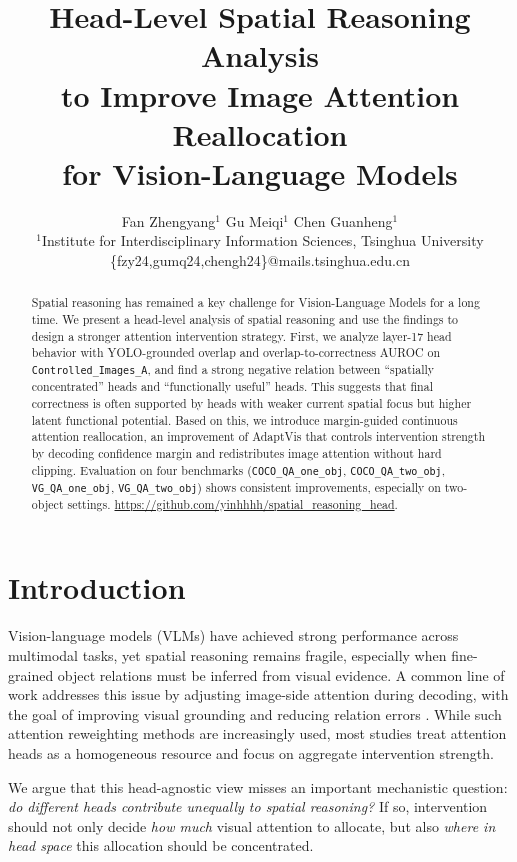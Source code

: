 \documentclass{article}
\title{Head-Level Spatial Reasoning Analysis \\
to Improve Image Attention Reallocation \\
for Vision-Language Models}
\author{
Fan Zhengyang$^{1}$ \quad Gu Meiqi$^{1}$ \quad Chen Guanheng$^{1}$ \\
$^{1}$Institute for Interdisciplinary Information Sciences, Tsinghua University \\
\{fzy24,gumq24,chengh24\}@mails.tsinghua.edu.cn
}
\date{}
\begin{document}
\maketitle

\begin{abstract}
Spatial reasoning has remained a key challenge for Vision-Language
Models for a long time. We present a head-level analysis of spatial
reasoning and use the findings to design a stronger attention
intervention strategy. First, we analyze layer-17 head behavior with
YOLO-grounded overlap and overlap-to-correctness AUROC on
\texttt{Controlled\_Images\_A}, and find a strong negative relation
between ``spatially concentrated'' heads and ``functionally useful''
heads. This suggests that final correctness is often supported by heads
with weaker current spatial focus but higher latent functional
potential. Based on this, we introduce margin-guided continuous
attention reallocation, an improvement of AdaptVis that controls
intervention strength by decoding confidence margin and redistributes
image attention without hard clipping. Evaluation on four benchmarks
(\texttt{COCO\_QA\_one\_obj}, \texttt{COCO\_QA\_two\_obj},
\texttt{VG\_QA\_one\_obj}, \texttt{VG\_QA\_two\_obj}) shows consistent
improvements, especially on two-object settings.
\url{https://github.com/yinhhhh/spatial_reasoning_head}.
\end{abstract}

\section{Introduction}
Vision-language models (VLMs) have achieved strong performance across
multimodal tasks, yet spatial
reasoning remains fragile, especially when fine-grained object
relations must be inferred from visual evidence. A common line of work
addresses this issue by adjusting image-side attention during decoding,
with the goal of improving visual grounding and reducing relation
errors \citep{chen2024adaptvis}. While such attention reweighting methods are
increasingly used, most studies treat attention heads as a homogeneous
resource and focus on aggregate intervention strength.

We argue that this head-agnostic view misses an important mechanistic
question: \emph{do different heads contribute unequally to spatial
reasoning?} If so, intervention should not only decide \emph{how much}
visual attention to allocate, but also \emph{where in head space} this
allocation should be concentrated. 
\end{document}

